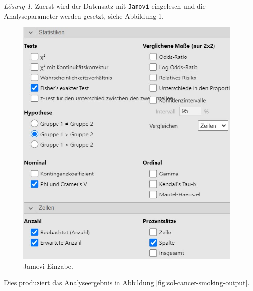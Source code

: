 \documentclass[
]{book}
\theoremstyle{definition}
\theoremstyle{definition}
\theoremstyle{definition}
\theoremstyle{definition}
\theoremstyle{remark}
\newtheorem*{solution}{Lösung}
\begin{document}
\begin{solution}

Zuerst wird der Datensatz mit \texttt{Jamovi} eingelesen und die
Analyseparameter werden gesetzt, siehe Abbildung
\ref{fig:sol-bio-milch-input}.

\begin{figure}

{\centering \includegraphics{figures/09-exr-bio-milch-jmv-input} 

}

\caption{Jamovi Eingabe.}\label{fig:sol-bio-milch-input}
\end{figure}

Dies produziert das Analyseergebnis in Abbildung
\ref{fig:sol-cancer-smoking-output}.

\begin{figure}


\end{figure}
\end{solution}
\end{document}
